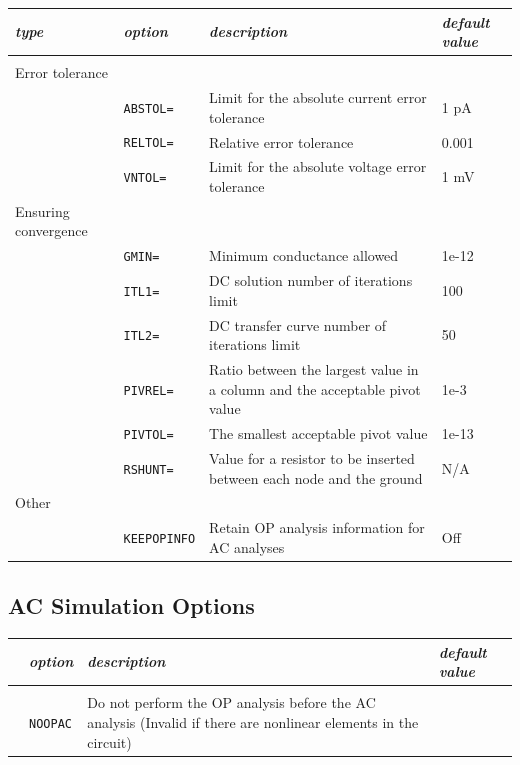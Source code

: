 \begin{tabular}{p{2cm}|lp{8cm}p{1.5cm}}
\textit{type} &\textit{option} & \textit{description} & \textit{default value}\\ \hline \\ \vspace{-0.8\parskip}
{{\footnotesize Error tolerance}} & & & \\
&\texttt{ABSTOL=} & Limit for the absolute current error tolerance & 1 pA \\
&\texttt{RELTOL=} & Relative error tolerance & 0.001  \\
&\texttt{VNTOL=} & Limit for the absolute voltage error tolerance & 1 mV  \\
{{\footnotesize Ensuring convergence}} & & & \\
&\texttt{GMIN=} & Minimum conductance allowed & 1e-12 \\
&\texttt{ITL1=} & DC solution number of iterations limit & 100  \\
&\texttt{ITL2=} & DC transfer curve number of iterations limit & 50  \\
&\texttt{PIVREL=} & Ratio between the largest value in a column and the acceptable pivot value & 1e-3  \\
&\texttt{PIVTOL=} & The smallest acceptable pivot value & 1e-13  \\
&\texttt{RSHUNT=} & Value for a resistor to be inserted between each node and the ground & N/A  \\
{\footnotesize Other} & & & \\
&\texttt{KEEPOPINFO} & Retain OP analysis information for AC analyses & Off 
\end{tabular}


\subsection{AC Simulation Options}
\label{subsec_satco_acoptions}

\begin{tabular}{p{2cm}|lp{8cm}p{1.5cm}}
&\textit{option} & \textit{description} & \textit{default value}\\ \hline \\ \vspace{-0.8\parskip}
&\texttt{NOOPAC} & Do not perform the OP analysis before the AC analysis (Invalid if there are nonlinear elements in the circuit) & \\
\end{tabular}

